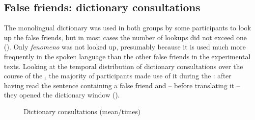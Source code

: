 \documentclass[output=paper]{langsci/langscibook.cls}
\begin{document}
\subsection{False friends: dictionary consultations} 
The monolingual dictionary was used in both groups by some participants to look up the false friends, but in most cases the number of lookups did not exceed one (). Only \textit{fenomeno} was not looked up, presumably because it is used much more frequently in the spoken language than the other false friends in the experimental texts. Looking at the temporal distribution of dictionary consultations over the course of the , the majority of participants made use of it during the : after having read the sentence containing a false friend and -- before translating it -- they opened the dictionary window (). 

\begin{figure}

 	\caption{Dictionary consultations (mean/times)}
 	\label{kloster:fig:6}
\end{figure}
\end{document}
